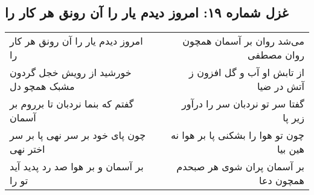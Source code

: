 \begin{center}
\section*{غزل شماره ۱۹: امروز دیدم یار را آن رونق هر کار را}
\label{sec:0019}
\begin{longtable}{l p{0.5cm} r}
امروز دیدم یار را آن رونق هر کار را
&&
می‌شد روان بر آسمان همچون روان مصطفی
\\
خورشید از رویش خجل گردون مشبک همچو دل
&&
از تابش او آب و گل افزون ز آتش در ضیا
\\
گفتم که بنما نردبان تا برروم بر آسمان
&&
گفتا سر تو نردبان سر را درآور زیر پا
\\
چون پای خود بر سر نهی پا بر سر اختر نهی
&&
چون تو هوا را بشکنی پا بر هوا نه هین بیا
\\
بر آسمان و بر هوا صد رد پدید آید تو را
&&
بر آسمان پران شوی هر صبحدم همچون دعا
\\
\end{longtable}
\end{center}
